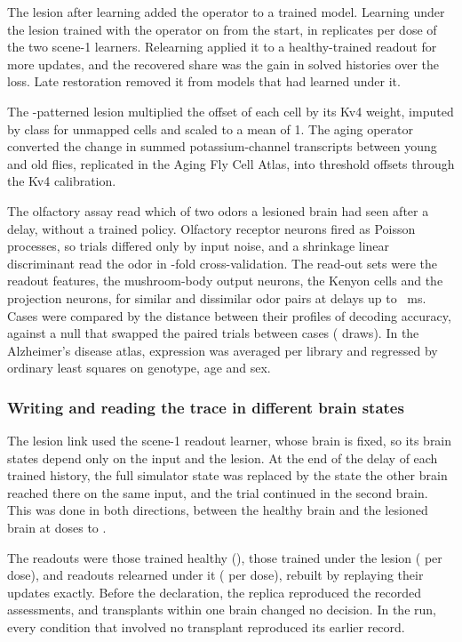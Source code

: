 The lesion after learning added the operator to a trained model. Learning under the lesion trained with the operator on from
the start, in  replicates per dose of the two scene-1 learners. Relearning applied it to a healthy-trained readout
for  more updates, and the recovered share was the gain in solved histories over the loss. Late restoration removed
it from models that had learned under it.

The -patterned lesion multiplied the offset of each cell by its Kv4 weight, imputed by class for unmapped cells and
scaled to a mean of 1. The aging operator converted the change in summed potassium-channel transcripts between young and old
flies, replicated in the Aging Fly Cell Atlas, into threshold offsets through the Kv4
calibration.

The olfactory assay read which of two odors a lesioned brain had seen after a delay, without a trained policy. Olfactory receptor neurons
fired as Poisson processes, so trials differed only by input noise, and a shrinkage linear discriminant read the odor in
-fold cross-validation. The read-out sets were the readout features, the mushroom-body output neurons, the Kenyon
cells and the projection neurons, for similar and dissimilar odor pairs at delays up to ~ms. Cases were compared
by the distance between their profiles of decoding accuracy, against a null that swapped the paired trials between cases
( draws). In the Alzheimer's disease atlas, expression was averaged per library and regressed by
ordinary least squares on genotype, age and sex.

\subsubsection{Writing and reading the trace in different brain states}

The lesion link used the scene-1 readout learner, whose brain is fixed, so its brain states depend only on the input and the
lesion. At the end of the delay of each trained history, the full simulator state was replaced by the state the other brain
reached there on the same input, and the trial continued in the second brain. This was done in both directions, between the
healthy brain and the lesioned brain at doses  to .

The readouts were those trained healthy (), those trained under the lesion ( per dose), and readouts
relearned under it ( per dose), rebuilt by replaying their  updates exactly. Before the declaration,
the replica reproduced the recorded assessments, and transplants within one brain changed no decision. In the run, every
condition that involved no transplant reproduced its earlier record.

